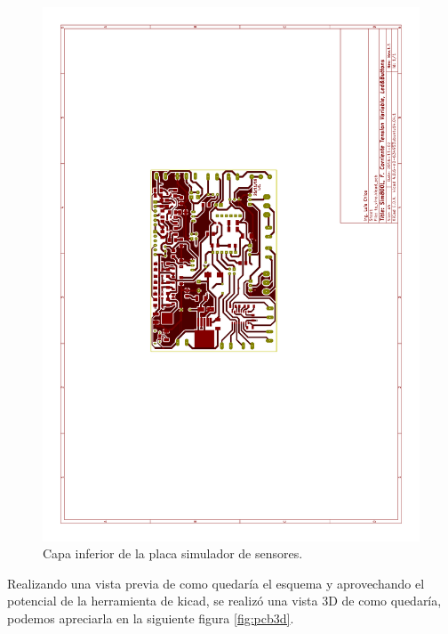 \begin{figure}[h]
      \centering
      \includegraphics[page=2,scale=0.5,angle=270]{./Figures/pcb_layer.pdf}
      \caption{Capa inferior de la placa simulador de sensores.}
      \label{fig:layer_inf}
\end{figure}

Realizando una vista previa de como quedaría el esquema y aprovechando el potencial de la herramienta de kicad, se realizó una vista 3D de como quedaría, podemos apreciarla en la siguiente figura \ref{fig:pcb3d}.


